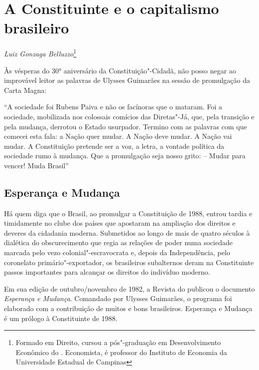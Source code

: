 \chapter*{A Constituinte e o capitalismo brasileiro}


\begin{flushright}
\emph{Luiz Gonzaga Belluzzo}\footnote{Formado em Direito, cursou a pós"-graduação em Desenvolvimento Econômico do . Economista, é professor do Instituto de Economia da Universidade Estadual de Campinas}
\end{flushright}

Às vésperas do 30° aniversário da Constituição"-Cidadã, não posso negar
ao improvável leitor as palavras de Ulysses Guimarães na sessão de
promulgação da Carta Magna:

``A sociedade foi Rubens Paiva e não os facínoras que o mataram. Foi a
sociedade, mobilizada nos colossais comícios das Diretas"-Já, que, pela
transição e pela mudança, derrotou o Estado usurpador. Termino com as
palavras com que comecei esta fala: a Nação quer mudar. A Nação deve
mudar. A Nação vai mudar. A Constituição pretende ser a voz, a letra, a
vontade política da sociedade rumo à mudança. Que a promulgação seja
nosso grito: -- Mudar para vencer! Muda Brasil''

\section{Esperança e Mudança}

Há quem diga que o Brasil, ao promulgar a Constituição de 1988, entrou
tardia e timidamente no clube dos países que apostaram na ampliação dos
direitos e deveres da cidadania moderna. Submetidos ao longo de mais de
quatro séculos à dialética do obscurecimento que regia as relações de
poder numa sociedade marcada pelo vezo colonial"-escravocrata e, depois
da Independência, pelo coronelato primário"-exportador, os brasileiros
subalternos deram na Constituinte passos importantes para alcançar os
direitos do indivíduo moderno.

Em sua edição de outubro/novembro de 1982, a Revista do  publicou o
documento \emph{Esperança e Mudança}. Comandado por Ulysses Guimarães, o
programa foi elaborado com a contribuição de muitos e bons brasileiros.
Esperança e Mudança é um prólogo à Constituinte de 1988.

